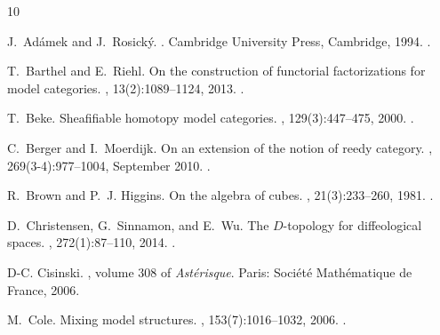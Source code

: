 \documentclass[a4paper,12pt]{amsart}
\theoremstyle{definition}
\begin{document}
\begin{thebibliography}{10}
	
	J.~Ad{\'a}mek and J.~Rosick{\'y}.
	.
	\newblock Cambridge University Press, Cambridge, 1994.
	\newblock \href {https://doi.org/10.1017/cbo9780511600579.004}
	{}.
	
	T.~Barthel and E.~Riehl.
	\newblock On the construction of functorial factorizations for model
	categories.
	, 13(2):1089--1124, 2013.
	\newblock \href {https://doi.org/10.2140/agt.2013.13.1089}
	{}.
	
	T.~Beke.
	\newblock Sheafifiable homotopy model categories.
	, 129(3):447--475, 2000.
	\newblock \href {https://doi.org/10.1017/S0305004100004722}
	{}.
	
	C.~Berger and I.~Moerdijk.
	\newblock On an extension of the notion of reedy category.
	, 269(3-4):977--1004, September 2010.
	\newblock \href {https://doi.org/10.1007/s00209-010-0770-x}
	{}.
	
	R.~Brown and P.~J. Higgins.
	\newblock On the algebra of cubes.
	, 21(3):233--260, 1981.
	\newblock \href {https://doi.org/10.1016/0022-4049(81)90018-9}
	{}.
	
	D.~Christensen, G.~Sinnamon, and E.~Wu.
	\newblock The {$D$}-topology for diffeological spaces.
	, 272(1):87--110, 2014.
	\newblock \href {https://doi.org/10.2140/pjm.2014.272.87}
	{}.
	
	D-C. Cisinski.
	,
	volume 308 of {\em Ast{\'e}risque}.
	\newblock Paris: Soci{\'e}t{\'e} Math{\'e}matique de France, 2006.
	
	M.~Cole.
	\newblock Mixing model structures.
	, 153(7):1016--1032, 2006.
	\newblock \href {https://doi.org/10.1016/j.topol.2005.02.004}
	{}.
	

\end{thebibliography}
\end{document}
